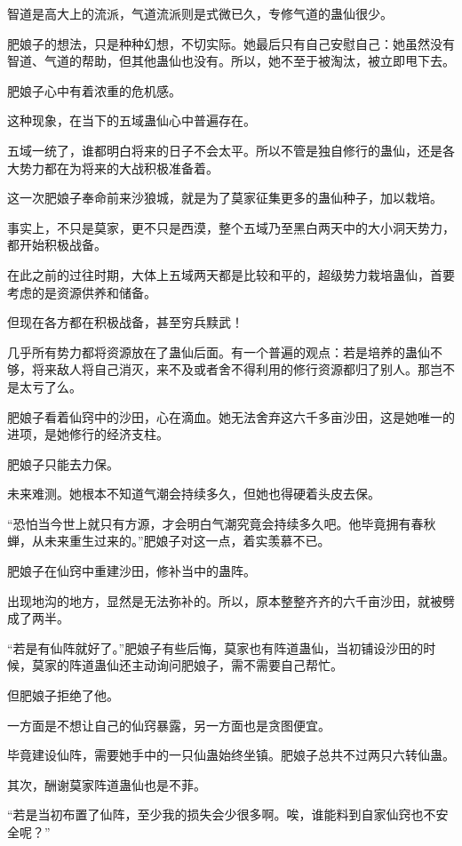 \begin{this_body}
智道是高大上的流派，气道流派则是式微已久，专修气道的蛊仙很少。

肥娘子的想法，只是种种幻想，不切实际。她最后只有自己安慰自己：她虽然没有智道、气道的帮助，但其他蛊仙也没有。所以，她不至于被淘汰，被立即甩下去。

肥娘子心中有着浓重的危机感。

这种现象，在当下的五域蛊仙心中普遍存在。

五域一统了，谁都明白将来的日子不会太平。所以不管是独自修行的蛊仙，还是各大势力都在为将来的大战积极准备着。

这一次肥娘子奉命前来沙狼城，就是为了莫家征集更多的蛊仙种子，加以栽培。

事实上，不只是莫家，更不只是西漠，整个五域乃至黑白两天中的大小洞天势力，都开始积极战备。

在此之前的过往时期，大体上五域两天都是比较和平的，超级势力栽培蛊仙，首要考虑的是资源供养和储备。

但现在各方都在积极战备，甚至穷兵黩武！

几乎所有势力都将资源放在了蛊仙后面。有一个普遍的观点：若是培养的蛊仙不够，将来敌人将自己消灭，来不及或者舍不得利用的修行资源都归了别人。那岂不是太亏了么。

肥娘子看着仙窍中的沙田，心在滴血。她无法舍弃这六千多亩沙田，这是她唯一的进项，是她修行的经济支柱。

肥娘子只能去力保。

未来难测。她根本不知道气潮会持续多久，但她也得硬着头皮去保。

“恐怕当今世上就只有方源，才会明白气潮究竟会持续多久吧。他毕竟拥有春秋蝉，从未来重生过来的。”肥娘子对这一点，着实羡慕不已。

肥娘子在仙窍中重建沙田，修补当中的蛊阵。

出现地沟的地方，显然是无法弥补的。所以，原本整整齐齐的六千亩沙田，就被劈成了两半。

“若是有仙阵就好了。”肥娘子有些后悔，莫家也有阵道蛊仙，当初铺设沙田的时候，莫家的阵道蛊仙还主动询问肥娘子，需不需要自己帮忙。

但肥娘子拒绝了他。

一方面是不想让自己的仙窍暴露，另一方面也是贪图便宜。

毕竟建设仙阵，需要她手中的一只仙蛊始终坐镇。肥娘子总共不过两只六转仙蛊。

其次，酬谢莫家阵道蛊仙也是不菲。

“若是当初布置了仙阵，至少我的损失会少很多啊。唉，谁能料到自家仙窍也不安全呢？”


\end{this_body}
